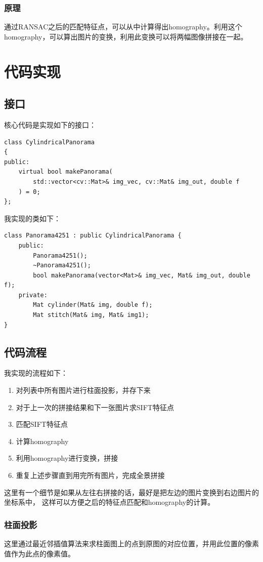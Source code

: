 \documentclass{article}
\begin{document}
\subsubsection{原理}
通过RANSAC之后的匹配特征点，可以从中计算得出homography。利用这个homography，可以算出图片的变换，利用此变换可以将两幅图像拼接在一起。

\section{代码实现}
\subsection{接口}
核心代码是实现如下的接口：
\begin{lstlisting}
class CylindricalPanorama
{
public:
    virtual bool makePanorama(
        std::vector<cv::Mat>& img_vec, cv::Mat& img_out, double f
    ) = 0;
};
\end{lstlisting}
我实现的类如下：
\begin{lstlisting}
class Panorama4251 : public CylindricalPanorama {
    public:
        Panorama4251();
        ~Panorama4251();
        bool makePanorama(vector<Mat>& img_vec, Mat& img_out, double f);
    private:
        Mat cylinder(Mat& img, double f);
        Mat stitch(Mat& img, Mat& img1);
}
\end{lstlisting}
\subsection{代码流程}
我实现的流程如下：
\begin{enumerate}  
    \item 对列表中所有图片进行柱面投影，并存下来
    \item 对于上一次的拼接结果和下一张图片求SIFT特征点
    \item 匹配SIFT特征点
    \item 计算homography
    \item 利用homography进行变换，拼接
    \item 重复上述步骤直到用完所有图片，完成全景拼接
\end{enumerate}
这里有一个细节是如果从左往右拼接的话，最好是把左边的图片变换到右边图片的坐标系中，
这样可以方便之后的特征点匹配和homography的计算。
\subsubsection{柱面投影}
这里通过最近邻插值算法来求柱面图上的点到原图的对应位置，并用此位置的像素值作为此点的像素值。
\end{document}
